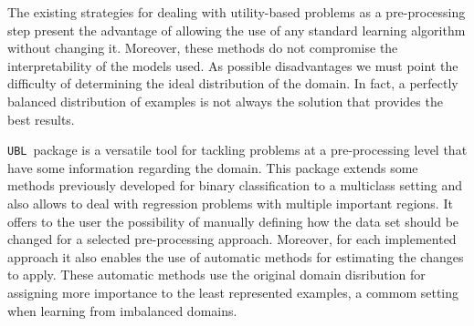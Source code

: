 \documentclass[10pt,a4paper]{article}\usepackage[]{graphicx}\usepackage[]{color}
\newcommand{\UBLp}{\texttt{UBL}\ package  }
\begin{document}
The existing strategies for dealing with utility-based problems as a pre-processing step present the advantage of allowing the use of any standard learning algorithm without changing it. Moreover, these methods do not compromise the interpretability of the models used. As possible disadvantages we must point the difficulty of determining the ideal distribution of the domain. In fact, a perfectly balanced distribution of examples is not always the solution that provides the best results.

\UBLp is a versatile tool for tackling problems at a pre-processing level that have some information regarding the domain. This package extends some methods previously developed for binary classification to a multiclass setting and also allows to deal with regression problems with multiple important regions. It offers to the user the possibility of manually defining how the data set should be changed for a selected pre-processing approach. Moreover, for each implemented approach it also enables the use of automatic methods for estimating the changes to apply. These automatic methods use the original domain disribution for assigning more importance to the least represented examples, a commom setting when learning from imbalanced domains.

\newpage



\end{document}
